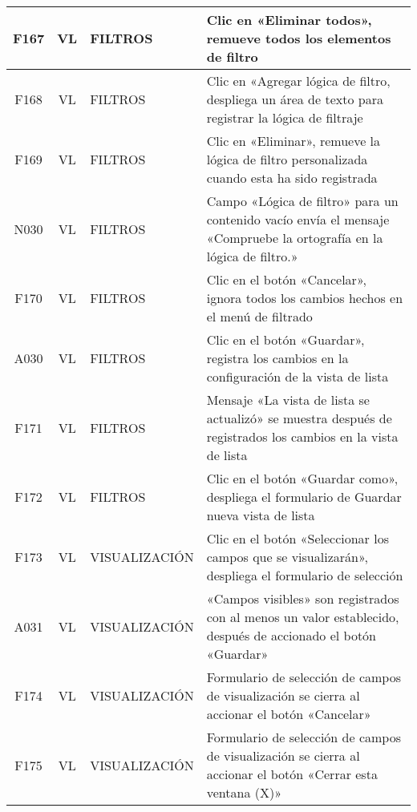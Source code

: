 \begin{landscape}
{\begin{longtable}[htb]{|c|c|p{3.8cm}|p{15.2cm}|}
\scriptsize{F167} & \scriptsize{VL} & \scriptsize{FILTROS} & \scriptsize{Clic en «Eliminar todos», remueve todos los elementos de filtro} \\ \hline
\scriptsize{F168} & \scriptsize{VL} & \scriptsize{FILTROS} & \scriptsize{Clic en «Agregar lógica de filtro, despliega un área de texto para registrar la lógica de filtraje} \\ \hline
\scriptsize{F169} & \scriptsize{VL} & \scriptsize{FILTROS} & \scriptsize{Clic en «Eliminar», remueve la lógica de filtro personalizada cuando esta ha sido registrada} \\ \hline
\scriptsize{N030} & \scriptsize{VL} & \scriptsize{FILTROS} & \scriptsize{Campo «Lógica de filtro» para un contenido vacío envía el mensaje «Compruebe la ortografía en la lógica de filtro.»} \\ \hline
\scriptsize{F170} & \scriptsize{VL} & \scriptsize{FILTROS} & \scriptsize{Clic en el botón «Cancelar», ignora todos los cambios hechos en el menú de filtrado} \\ \hline
\scriptsize{A030} & \scriptsize{VL} & \scriptsize{FILTROS} & \scriptsize{Clic en el botón «Guardar», registra los cambios en la configuración de la vista de lista} \\ \hline
\scriptsize{F171} & \scriptsize{VL} & \scriptsize{FILTROS} & \scriptsize{Mensaje «La vista de lista se actualizó» se muestra después de registrados los cambios en la vista de lista} \\ \hline
\scriptsize{F172} & \scriptsize{VL} & \scriptsize{FILTROS} & \scriptsize{Clic en el botón «Guardar como», despliega el formulario de Guardar nueva vista de lista} \\ \hline
\scriptsize{F173} & \scriptsize{VL} & \scriptsize{VISUALIZACIÓN} & \scriptsize{Clic en el botón «Seleccionar los campos que se visualizarán», despliega el formulario de selección} \\ \hline
\scriptsize{A031} & \scriptsize{VL} & \scriptsize{VISUALIZACIÓN} & \scriptsize{«Campos visibles» son registrados con al menos un valor establecido, después de accionado el botón «Guardar»} \\ \hline
\scriptsize{F174} & \scriptsize{VL} & \scriptsize{VISUALIZACIÓN} & \scriptsize{Formulario de selección de campos de visualización se cierra al accionar el botón «Cancelar»} \\ \hline
\scriptsize{F175} & \scriptsize{VL} & \scriptsize{VISUALIZACIÓN} & \scriptsize{Formulario de selección de campos de visualización se cierra al accionar el botón «Cerrar esta ventana (X)»} \\ \hline

\end{longtable}}
\end{landscape}
